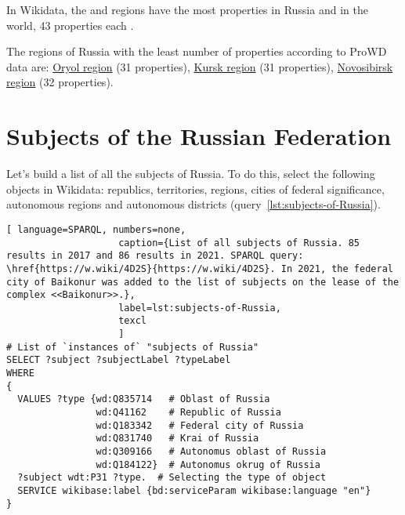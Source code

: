 In Wikidata, the  and  regions have the most properties in Russia and in the world, 43 properties each \autocite{Russia_prowd}.

The regions of Russia with the least number of properties according to ProWD data are: \href{http://www.wikidata.org/entity/Q3129 }{Oryol region} (31 properties), \href{http://www.wikidata.org/entity/Q3178 }{Kursk region} (31 properties), \href{http://www.wikidata.org/entity/Q5851 }{Novosibirsk region} (32 properties).

\section{Subjects of the Russian Federation}

Let's build a list of all the subjects of Russia. To do this, select the following objects in Wikidata: republics, territories, regions, cities of federal significance, autonomous regions and autonomous districts (query~\protect\ref{lst:subjects-of-Russia}).


\begin{lstlisting}[ language=SPARQL, numbers=none,
                    caption={List of all subjects of Russia. 85 results in 2017 and 86 results in 2021. SPARQL query: \href{https://w.wiki/4D2S}{https://w.wiki/4D2S}. In 2021, the federal city of Baikonur was added to the list of subjects on the lease of the complex <<Baikonur>>.},
                    label=lst:subjects-of-Russia,
                    texcl 
                    ]
# List of `instances of` "subjects of Russia" 
SELECT ?subject ?subjectLabel ?typeLabel
WHERE
{  
  VALUES ?type {wd:Q835714   # Oblast of Russia
                wd:Q41162    # Republic of Russia
                wd:Q183342   # Federal city of Russia
                wd:Q831740   # Krai of Russia
                wd:Q309166   # Autonomus oblast of Russia
                wd:Q184122}  # Autonomus okrug of Russia
  ?subject wdt:P31 ?type.  # Selecting the type of object
  SERVICE wikibase:label {bd:serviceParam wikibase:language "en"}
}
\end{lstlisting}%

